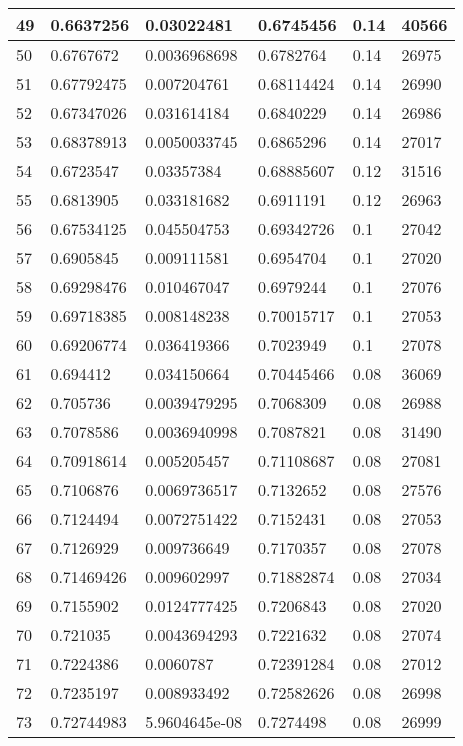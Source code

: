 \begin{longtable}{|l|l|l|l|l|l|}
49 & 0.6637256 & 0.03022481 & 0.6745456 & 0.14 & 40566 \\ \hline 
50 & 0.6767672 & 0.0036968698 & 0.6782764 & 0.14 & 26975 \\ \hline 
51 & 0.67792475 & 0.007204761 & 0.68114424 & 0.14 & 26990 \\ \hline 
52 & 0.67347026 & 0.031614184 & 0.6840229 & 0.14 & 26986 \\ \hline 
53 & 0.68378913 & 0.0050033745 & 0.6865296 & 0.14 & 27017 \\ \hline 
54 & 0.6723547 & 0.03357384 & 0.68885607 & 0.12 & 31516 \\ \hline 
55 & 0.6813905 & 0.033181682 & 0.6911191 & 0.12 & 26963 \\ \hline 
56 & 0.67534125 & 0.045504753 & 0.69342726 & 0.1 & 27042 \\ \hline 
57 & 0.6905845 & 0.009111581 & 0.6954704 & 0.1 & 27020 \\ \hline 
58 & 0.69298476 & 0.010467047 & 0.6979244 & 0.1 & 27076 \\ \hline 
59 & 0.69718385 & 0.008148238 & 0.70015717 & 0.1 & 27053 \\ \hline 
60 & 0.69206774 & 0.036419366 & 0.7023949 & 0.1 & 27078 \\ \hline 
61 & 0.694412 & 0.034150664 & 0.70445466 & 0.08 & 36069 \\ \hline 
62 & 0.705736 & 0.0039479295 & 0.7068309 & 0.08 & 26988 \\ \hline 
63 & 0.7078586 & 0.0036940998 & 0.7087821 & 0.08 & 31490 \\ \hline 
64 & 0.70918614 & 0.005205457 & 0.71108687 & 0.08 & 27081 \\ \hline 
65 & 0.7106876 & 0.0069736517 & 0.7132652 & 0.08 & 27576 \\ \hline 
66 & 0.7124494 & 0.0072751422 & 0.7152431 & 0.08 & 27053 \\ \hline 
67 & 0.7126929 & 0.009736649 & 0.7170357 & 0.08 & 27078 \\ \hline 
68 & 0.71469426 & 0.009602997 & 0.71882874 & 0.08 & 27034 \\ \hline 
69 & 0.7155902 & 0.0124777425 & 0.7206843 & 0.08 & 27020 \\ \hline 
70 & 0.721035 & 0.0043694293 & 0.7221632 & 0.08 & 27074 \\ \hline 
71 & 0.7224386 & 0.0060787 & 0.72391284 & 0.08 & 27012 \\ \hline 
72 & 0.7235197 & 0.008933492 & 0.72582626 & 0.08 & 26998 \\ \hline 
73 & 0.72744983 & 5.9604645e-08 & 0.7274498 & 0.08 & 26999 \\ \hline 

\end{longtable}
